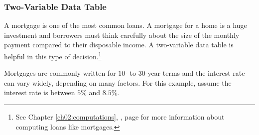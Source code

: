 \subsubsection{Two-Variable Data Table}

A mortgage is one of the most common loans. A mortgage for a home is a huge investment and borrowers must think carefully about the size of the monthly payment compared to their disposable income. A two-variable data table is helpful in this type of decision.\footnote{See Chapter \ref{ch02:computations}, , page \pageref{ch02:computations} for more information about computing loans like mortgages.}

Mortgages are commonly written for $ 10 $- to $ 30 $-year terms and the interest rate can vary widely, depending on many factors. For this example, assume the interest rate is between $ 5\% $ and $ 8.5\% $.

